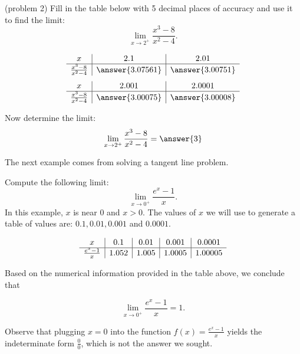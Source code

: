\documentclass[handout]{ximera}
\begin{document}
\begin{problem}(problem 2)
Fill in the table below with 5 decimal places of accuracy and use it to find the limit:
\[\lim_{x \to 2^+} \frac{x^3 - 8}{x^2 - 4}.\]

\begin{center}
\[
\begin{array}{ c | c | c }
  x & 2.1 & 2.01   \\ 
	\hline 
	 \frac{x^3 - 8}{x^2 - 4} & \answer{3.07561} & \answer{3.00751} 
\end{array}
\]
\[
\begin{array}{ c | c | c  }
  x  & 2.001 & 2.0001 \\ 
	\hline 
	 \frac{x^3 - 8}{x^2 - 4}  & \answer{3.00075} & \answer{3.00008}
\end{array}
\]
\end{center}
Now determine the limit:
\[
\lim_{x \to 2^+} \frac{x^3 - 8}{x^2 - 4} = \answer{3}
\]
\end{problem}


The next example comes from solving a tangent line problem.



\begin{example}[example 3]
Compute the following limit:
\[\lim_{x \to 0^{+}} \frac{e^x-1}{x}.\]
In this example, $x$ is near $0$ and $x>0$.  The values of $x$ we will use to 
generate a table of values are: $0.1, 0.01, 0.001$ and $0.0001.$

\[
\begin{array}{ c | c | c | c | c }
  x & 0.1 & 0.01  & 0.001 & 0.0001 \\ 
	\hline
	 \frac{e^x - 1}{x} & 1.052 & 1.005 & 1.0005 & 1.00005
\end{array}
\]

Based on the numerical information provided in the table above, we conclude that 

\[\lim_{x \to 0^+} \frac{e^x - 1}{x} = 1.\]


Observe that plugging $x=0$ into the 
function $\displaystyle{f(x)= \frac{e^x -1}{x}}$ yields the indeterminate form $\frac{0}{0}$, which is not
the answer we sought.

\end{example}
\end{document}
